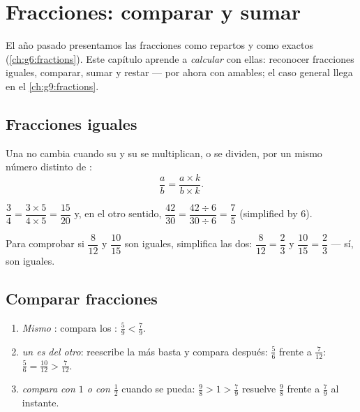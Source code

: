 \chapter{Fracciones: comparar y sumar}\label{ch:g7:fractions}

El año pasado presentamos las fracciones como repartos y como  exactos
(\cref{ch:g6:fractions}). Este capítulo aprende a \emph{calcular} con
ellas: reconocer fracciones iguales, comparar, sumar y restar
--- por ahora con  amables; el caso general llega en el
\cref{ch:g9:fractions}.

\section{Fracciones iguales}

\begin{theorem}\label{thm:g7:fractions:equal}
Una  no cambia cuando su  y su  se
multiplican, o se dividen, por un mismo número distinto de :
\[
\frac{a}{b} = \frac{a \times k}{b \times k} .
\]
\end{theorem}
\admitted

\begin{example}\label{ex:g7:fractions:equal}
$\dfrac{3}{4} = \dfrac{3 \times 5}{4 \times 5} = \dfrac{15}{20}$ y,
en el otro sentido, $\dfrac{42}{30} = \dfrac{42 \div 6}{30 \div 6}
= \dfrac{7}{5}$ (simplified by $6$).

Para comprobar si $\dfrac{8}{12}$ y $\dfrac{10}{15}$ son iguales,
simplifica las dos: $\dfrac{8}{12} = \dfrac{2}{3}$ y
$\dfrac{10}{15} = \dfrac{2}{3}$ --- sí, son iguales.
\end{example}

\section{Comparar fracciones}

\begin{method}\label{met:g7:fractions:compare}
\begin{enumerate}
  \item \emph{Mismo }: compara los :
        $\frac{5}{9} < \frac{7}{9}$.
  \item \emph{un  es  del otro}: reescribe la
         más basta y compara después:
        $\frac{5}{6}$ frente a $\frac{7}{12}$: $\frac56 = \frac{10}{12} >
        \frac{7}{12}$.
  \item \emph{compara con $1$ o con $\frac12$} cuando se pueda:
        $\frac{9}{8} > 1 > \frac{7}{9}$ resuelve
        $\frac98$ frente a $\frac79$ al instante.
\end{enumerate}
\end{method}

